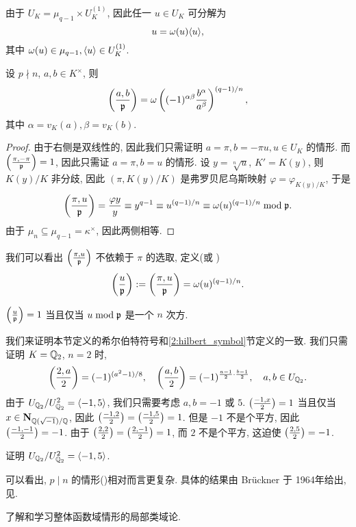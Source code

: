 由于 $U_K=\mu_{q-1}\times U_K^{(1)}$, 因此任一 $u\in U_K$ 可分解为
  \[u=\omega(u)\langle{u}\rangle,\]
其中 $\omega(u)\in \mu_{q-1},\langle{u}\rangle\in U_K^{(1)}$.

\begin{proposition}{}{}
设 $p\nmid n$, $a,b\in K^\times$, 则
  \[\left(\frac{{a},{b}}{{\mathfrak{p}}}\right)=\omega \left((-1)^{\alpha\beta}\frac{b^\alpha}{a^\beta}\right)^{(q-1)/n},\]
其中 $\alpha=v_K(a),\beta=v_K(b)$.
\end{proposition}
\begin{proof}
由于右侧是双线性的, 因此我们只需证明 $a=\pi,b=-\pi u,u\in U_K$ 的情形. 而 $\left(\frac{{\pi},{-\pi}}{{\mathfrak{p}}}\right)=1$, 因此只需证 $a=\pi,b=u$ 的情形.
设 $y=\sqrt[n]{u}$, $K'=K(y)$, 则 $K(y)/K$ 非分歧, 因此 $(\pi,K(y)/K)$ 是弗罗贝尼乌斯映射 $\varphi=\varphi_{K(y)/K}$, 于是
  \[\left(\frac{{\pi},{u}}{{\mathfrak{p}}}\right)=\frac{\varphi y}{y}\equiv y^{q-1}\equiv u^{(q-1)/n}\equiv \omega(u)^{(q-1)/n}\bmod{\mathfrak{p}}.\]
由于 $\mu_n\subseteq \mu_{q-1}=\kappa^\times$, 因此两侧相等.
\end{proof}

我们可以看出 $\left(\frac{{\pi},{u}}{{\mathfrak{p}}}\right)$ 不依赖于 $\pi$ 的选取, 定义(或 )
  \[\left(\frac{{u}}{{\mathfrak{p}}}\right):=\left(\frac{{\pi},{u}}{{\mathfrak{p}}}\right)=\omega(u)^{(q-1)/n}.\]

\begin{exercise}
$\left(\frac{{u}}{{\mathfrak{p}}}\right)=1$ 当且仅当 $u\bmod {\mathfrak{p}}$ 是一个 $n$ 次方.
\end{exercise}

我们来证明本节定义的希尔伯特符号和\ref{2:hilbert_symbol}节定义的一致. 我们只需证明 $K={\mathbb{Q}}_2$, $n=2$ 时,
  \[\left(\frac{{2},{a}}{2}\right)=(-1)^{(a^2-1)/8},\quad \left(\frac{{a},{b}}{2}\right)=(-1)^{\frac{a-1}{2}\cdot\frac{b-1}{2}},\quad a,b\in U_{{\mathbb{Q}}_2}.\]
由于 $U_{{\mathbb{Q}}_2}/U_{{\mathbb{Q}}_2}^2=\langle{-1,5}\rangle$, 我们只需要考虑 $a,b=-1$ 或 $5$. $\left(\frac{{-1},{x}}{2}\right)=1$ 当且仅当 $x\in{\mathbf{N}}_{{\mathbb{Q}}(\sqrt{-1})/{\mathbb{Q}}}$, 因此 $\left(\frac{{-1},{2}}{2}\right)=\left(\frac{{-1},{5}}{2}\right)=1$. 但是 $-1$ 不是个平方, 因此 $\left(\frac{{-1},{-1}}{2}\right)=-1$. 由于 $\left(\frac{{2},{2}}{2}\right)=\left(\frac{{2},{-1}}{2}\right)=1$, 而 $2$ 不是个平方, 这迫使 $\left(\frac{{2},{5}}{2}\right)=-1$.

\begin{exercise}
证明 $U_{{\mathbb{Q}}_2}/U_{{\mathbb{Q}}_2}^2=\langle{-1,5}\rangle$.
\end{exercise}

可以看出, $p\mid n$ 的情形()相对而言更复杂. 具体的结果由 Br\"uckner 于 1964年给出, 见\cite[Theorem~5.3.7]{Neukirch1999}.


\begin{exercise}
了解和学习整体函数域情形的局部类域论.
\end{exercise}



